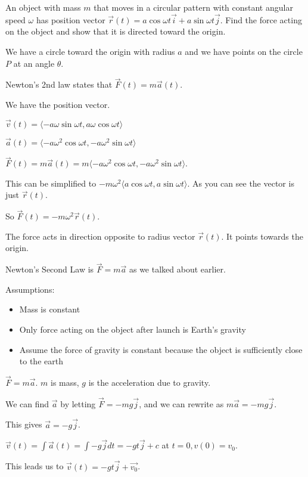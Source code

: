 \documentclass[../calc3.tex]{subfiles}
\begin{document}
\begin{example}
    An object with mass $m$ that moves in a circular pattern with constant angular speed $\omega$ has position vector $\vec{r}(t)=a\cos \omega t \vec{i}+a\sin\omega t \vec{j}$. Find the force acting on the object and show that it is directed toward the origin.

    We have a circle toward the origin with radius $a$ and we have points on the circle $P$ at an angle $\theta$.

    Newton's 2nd law states that $\vec{F}(t)=m\vec{a}(t)$.

    We have the position vector.

    $\vec{v}(t)=\langle -a\omega \sin\omega t, a\omega \cos\omega t\rangle$

    $\vec{a}(t)=\langle -a\omega^2\cos\omega t, -a\omega^2\sin\omega t\rangle$

    $\vec{F}(t)=m\vec{a}(t)=m\langle -a\omega^2\cos\omega t, -a\omega^2\sin\omega t\rangle$.

    This can be simplified to $-m\omega^2\langle a\cos\omega t, a\sin\omega t\rangle$. As you can see the vector is just $\vec{r}(t)$.

    So $\vec{F}(t)=-m\omega^2 \vec{r}(t)$.

    The force acts in direction opposite to radius vector $\vec{r}(t)$. It points towards the origin.
\end{example}

Newton's Second Law is $\vec{F}=m\vec{a}$ as we talked about earlier.

Assumptions:
\begin{itemize}
    \item Mass is constant 
    \item Only force acting on the object after launch is Earth's gravity
    \item Assume the force of gravity is constant because the object is sufficiently close to the earth 
\end{itemize}

$\vec{F}=m\vec{a}$. $m$ is mass, $g$ is the acceleration due to gravity.

We can find $\vec{a}$ by letting $\vec{F}=-mg\vec{j}$, and we can rewrite as $m\vec{a}=-mg\vec{j}$.

This gives $\vec{a}=-g\vec{j}$.

$\vec{v}(t)=\int \vec{a}(t)=\int -g\vec{j}dt = -gt\vec{j}+c$ at $t=0, v(0)=v_0$.

This leads us to $\vec{v}(t)=-gt\vec{j}+\vec{v_0}$.
\end{document}
